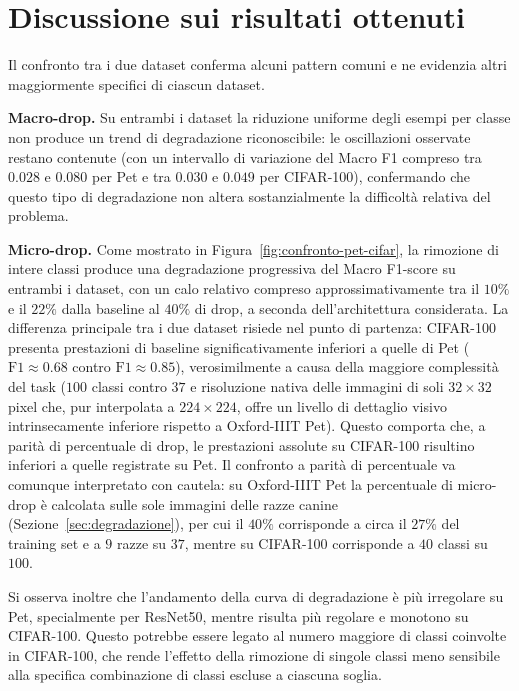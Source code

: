 \FloatBarrier

\clearpage
\section{Discussione sui risultati ottenuti}
\label{sec:discussione}

Il confronto tra i due dataset conferma alcuni pattern comuni e ne evidenzia altri maggiormente specifici di ciascun dataset.

\textbf{Macro-drop.} Su entrambi i dataset la riduzione uniforme degli esempi per classe non produce un trend di degradazione riconoscibile: le oscillazioni osservate restano contenute (con un intervallo di variazione del Macro F1 compreso tra $0.028$ e $0.080$ per Pet e tra $0.030$ e $0.049$ per CIFAR-100), confermando che questo tipo di degradazione non altera sostanzialmente la difficoltà relativa del problema.

\textbf{Micro-drop.} Come mostrato in Figura~\ref{fig:confronto-pet-cifar}, la rimozione di intere classi produce una degradazione progressiva del Macro F1-score su entrambi i dataset, con un calo relativo compreso approssimativamente tra il $10\%$ e il $22\%$ dalla baseline al $40\%$ di drop, a seconda dell'architettura considerata. La differenza principale tra i due dataset risiede nel punto di partenza: CIFAR-100 presenta prestazioni di baseline significativamente inferiori a quelle di Pet ($\text{F1} \approx 0.68$ contro $\text{F1} \approx 0.85$), verosimilmente a causa della maggiore complessità del task ($100$ classi contro $37$ e risoluzione nativa delle immagini di soli $32\times32$ pixel che, pur interpolata a $224\times224$, offre un livello di dettaglio visivo intrinsecamente inferiore rispetto a Oxford-IIIT Pet). Questo comporta che, a parità di percentuale di drop, le prestazioni assolute su CIFAR-100 risultino inferiori a quelle registrate su Pet. Il confronto a parità di percentuale va comunque interpretato con cautela: su Oxford-IIIT Pet la percentuale di micro-drop è calcolata sulle sole immagini delle razze canine (Sezione~\ref{sec:degradazione}), per cui il $40\%$ corrisponde a circa il $27\%$ del training set e a $9$ razze su $37$, mentre su CIFAR-100 corrisponde a $40$ classi su $100$.

Si osserva inoltre che l'andamento della curva di degradazione è più irregolare su Pet, specialmente per ResNet50, mentre risulta più regolare e monotono su CIFAR-100. Questo potrebbe essere legato al numero maggiore di classi coinvolte in CIFAR-100, che rende l'effetto della rimozione di singole classi meno sensibile alla specifica combinazione di classi escluse a ciascuna soglia.

